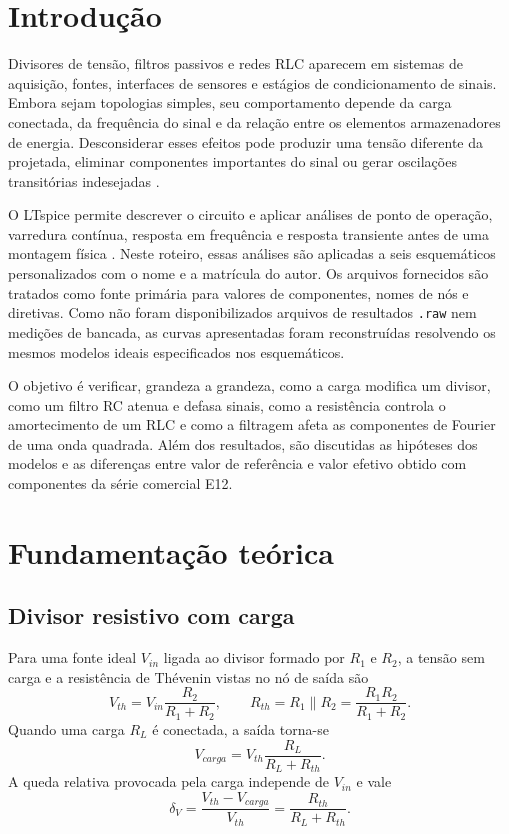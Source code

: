 \documentclass[10pt,journal,onecolumn,a4paper]{IEEEtran}
\begin{document}
\section{Introdução}

Divisores de tensão, filtros passivos e redes RLC aparecem em sistemas de aquisição, fontes,
interfaces de sensores e estágios de condicionamento de sinais. Embora sejam topologias simples,
seu comportamento depende da carga conectada, da frequência do sinal e da relação entre os
elementos armazenadores de energia. Desconsiderar esses efeitos pode produzir uma tensão diferente
da projetada, eliminar componentes importantes do sinal ou gerar oscilações transitórias indesejadas
\cite{sedra_smith,boylestad}.

O LTspice permite descrever o circuito e aplicar análises de ponto de operação, varredura contínua,
resposta em frequência e resposta transiente antes de uma montagem física \cite{analog_ltspice}.
Neste roteiro, essas análises são aplicadas a seis esquemáticos personalizados com o nome e a
matrícula do autor. Os arquivos fornecidos são tratados como fonte primária para valores de
componentes, nomes de nós e diretivas. Como não foram disponibilizados arquivos de resultados
\texttt{.raw} nem medições de bancada, as curvas apresentadas foram reconstruídas resolvendo os
mesmos modelos ideais especificados nos esquemáticos.

O objetivo é verificar, grandeza a grandeza, como a carga modifica um divisor, como um filtro RC
atenua e defasa sinais, como a resistência controla o amortecimento de um RLC e como a filtragem
afeta as componentes de Fourier de uma onda quadrada. Além dos resultados, são discutidas as
hipóteses dos modelos e as diferenças entre valor de referência e valor efetivo obtido com
componentes da série comercial E12.

\section{Fundamentação teórica}

\subsection{Divisor resistivo com carga}

Para uma fonte ideal $V_{in}$ ligada ao divisor formado por $R_1$ e $R_2$, a tensão sem carga e a
resistência de Thévenin vistas no nó de saída são
\begin{equation}
  V_{th}=V_{in}\frac{R_2}{R_1+R_2},
  \qquad
  R_{th}=R_1\parallel R_2=\frac{R_1R_2}{R_1+R_2}.
  \label{eq:thevenin}
\end{equation}
Quando uma carga $R_L$ é conectada, a saída torna-se
\begin{equation}
  V_{carga}=V_{th}\frac{R_L}{R_L+R_{th}}.
  \label{eq:divisor-carga}
\end{equation}
A queda relativa provocada pela carga independe de $V_{in}$ e vale
\begin{equation}
  \delta_V=\frac{V_{th}-V_{carga}}{V_{th}}
          =\frac{R_{th}}{R_L+R_{th}}.
  \label{eq:queda}
\end{equation}
\end{document}
